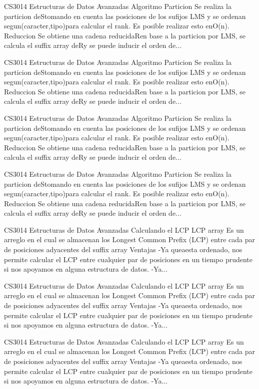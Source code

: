 \begin{description}[leftmargin=!,labelwidth=4.2em,style=nextline]
\item[Pag. 53] CS3014 Estructuras de Datos Avanzadas Algoritmo Particion Se realiza la particion deStomando en cuenta las posiciones de los sufijos LMS y se ordenan segun(caracter,tipo)para calcular el rank. Es posible realizar esto enO(n). Reduccion Se obtiene una cadena reducidaRen base a la particion por LMS, se calcula el suffix array deRy se puede inducir el orden de...
\item[Pag. 54] CS3014 Estructuras de Datos Avanzadas Algoritmo Particion Se realiza la particion deStomando en cuenta las posiciones de los sufijos LMS y se ordenan segun(caracter,tipo)para calcular el rank. Es posible realizar esto enO(n). Reduccion Se obtiene una cadena reducidaRen base a la particion por LMS, se calcula el suffix array deRy se puede inducir el orden de...
\item[Pag. 55] CS3014 Estructuras de Datos Avanzadas Algoritmo Particion Se realiza la particion deStomando en cuenta las posiciones de los sufijos LMS y se ordenan segun(caracter,tipo)para calcular el rank. Es posible realizar esto enO(n). Reduccion Se obtiene una cadena reducidaRen base a la particion por LMS, se calcula el suffix array deRy se puede inducir el orden de...
\item[Pag. 56] CS3014 Estructuras de Datos Avanzadas Algoritmo Particion Se realiza la particion deStomando en cuenta las posiciones de los sufijos LMS y se ordenan segun(caracter,tipo)para calcular el rank. Es posible realizar esto enO(n). Reduccion Se obtiene una cadena reducidaRen base a la particion por LMS, se calcula el suffix array deRy se puede inducir el orden de...
\item[Pag. 57] CS3014 Estructuras de Datos Avanzadas Calculando el LCP LCP array Es un arreglo en el cual se almacenan los Longest Common Prefix (LCP) entre cada par de posiciones adyacentes del suffix array Ventajas -Ya queaesta ordenado, nos permite calcular el LCP entre cualquier par de posiciones en un tiempo prudente si nos apoyamos en alguna estructura de datos. -Ya...
\item[Pag. 58] CS3014 Estructuras de Datos Avanzadas Calculando el LCP LCP array Es un arreglo en el cual se almacenan los Longest Common Prefix (LCP) entre cada par de posiciones adyacentes del suffix array Ventajas -Ya queaesta ordenado, nos permite calcular el LCP entre cualquier par de posiciones en un tiempo prudente si nos apoyamos en alguna estructura de datos. -Ya...
\item[Pag. 59] CS3014 Estructuras de Datos Avanzadas Calculando el LCP LCP array Es un arreglo en el cual se almacenan los Longest Common Prefix (LCP) entre cada par de posiciones adyacentes del suffix array Ventajas -Ya queaesta ordenado, nos permite calcular el LCP entre cualquier par de posiciones en un tiempo prudente si nos apoyamos en alguna estructura de datos. -Ya...

\end{description}

